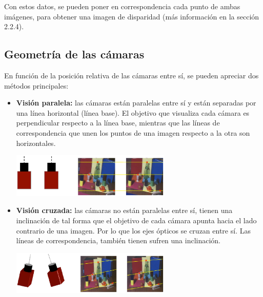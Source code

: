 Con estos datos, se pueden poner en correspondencia cada punto de ambas
imágenes, para obtener una imagen de disparidad (más información en la sección 
2.2.4).

\subsection{Geometría de las cámaras}
En función de la posición relativa de las cámaras entre sí, se pueden apreciar
dos métodos principales:

\begin{itemize}
  \item \textbf{Visión paralela:} las cámaras están paralelas entre sí y están
  separadas por una línea horizontal (línea base). El objetivo que visualiza
  cada cámara es perpendicular respecto a la línea base, mientras que las
  líneas de correspondencia que unen los puntos de una imagen respecto a la
  otra son horizontales.

  \begin{minipage}{\linewidth}
      \centering
      \includegraphics[width=0.6\textwidth]{images/cap2/VisionParalela.eps}
      \label{fig:VisionParalela}
  \end{minipage}

  \item \textbf{Visión cruzada:} las cámaras no están paralelas entre sí,
  tienen una inclinación de tal forma que el objetivo de cada cámara apunta
  hacia el lado contrario de una imagen. Por lo que los ejes ópticos se cruzan
  entre sí. Las líneas de correspondencia, también tienen sufren una
  inclinación.

  \begin{minipage}{\linewidth}
      \centering
      \includegraphics[width=0.6\textwidth]{images/cap2/VisionCruzada.eps}
      \label{fig:VisionCruzada}
  \end{minipage}
\end{itemize}

